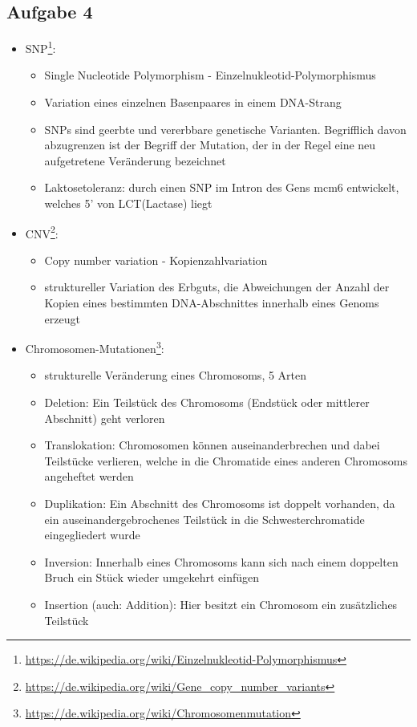 \documentclass[13pt,a4paper]{article}
\begin{document}
\subsection{Aufgabe 4}

\begin{itemize}
	\item SNP\footnote{\url{https://de.wikipedia.org/wiki/Einzelnukleotid-Polymorphismus}}:
	\begin{itemize}
		\item Single Nucleotide Polymorphism - Einzelnukleotid-Polymorphismus
		\item Variation eines einzelnen Basenpaares in einem DNA-Strang
		\item SNPs sind geerbte und vererbbare genetische Varianten. Begrifflich davon abzugrenzen ist der Begriff der Mutation, der in der Regel eine neu aufgetretene Veränderung bezeichnet
		\item Laktosetoleranz: durch einen SNP im Intron des Gens mcm6 entwickelt, welches 5' von LCT(Lactase) liegt
	\end{itemize}
	\item CNV\footnote{\url{https://de.wikipedia.org/wiki/Gene_copy_number_variants}}:
	\begin{itemize}
		\item Copy number variation - Kopienzahlvariation
		\item struktureller Variation des Erbguts, die Abweichungen der Anzahl der Kopien eines bestimmten DNA-Abschnittes innerhalb eines Genoms erzeugt
	\end{itemize}
	\item Chromosomen-Mutationen\footnote{\url{https://de.wikipedia.org/wiki/Chromosomenmutation}}:
	\begin{itemize}
		\item strukturelle Veränderung eines Chromosoms, 5 Arten
		\item Deletion: Ein Teilstück des Chromosoms (Endstück oder mittlerer Abschnitt) geht verloren
    	\item Translokation: Chromosomen können auseinanderbrechen und dabei Teilstücke verlieren, welche in die Chromatide eines anderen Chromosoms angeheftet werden
	    \item Duplikation: Ein Abschnitt des Chromosoms ist doppelt vorhanden, da ein auseinandergebrochenes Teilstück in die Schwesterchromatide eingegliedert wurde
	    \item Inversion: Innerhalb eines Chromosoms kann sich nach einem doppelten Bruch ein Stück wieder umgekehrt einfügen
	    \item Insertion (auch: Addition): Hier besitzt ein Chromosom ein zusätzliches Teilstück
	\end{itemize}
\end{itemize}
\end{document}
